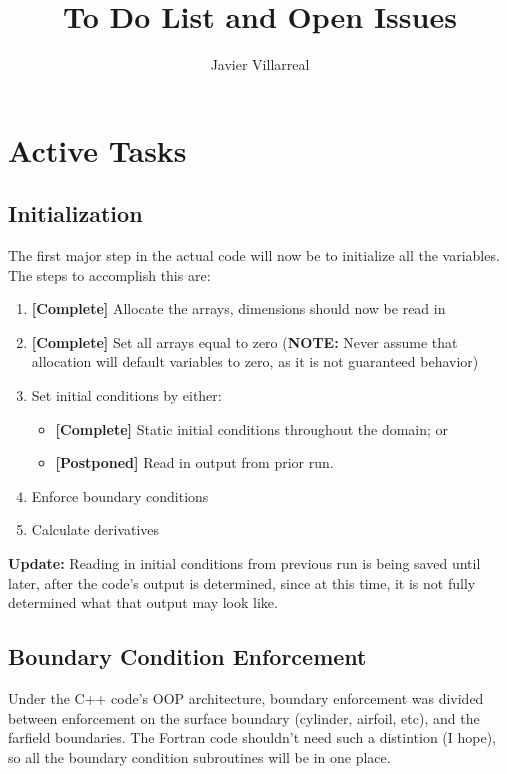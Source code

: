 \documentclass[12pt]{article}
\begin{document}
    \title{To Do List and Open Issues}
    \author{Javier Villarreal}
    \date{}
    \maketitle

    \section{Active Tasks}

    \subsection{Initialization}
    The first major step in the actual code will now be to initialize all the variables. The steps to accomplish this are:
    \begin{enumerate}
        \item \textbf{[Complete]} Allocate the arrays, dimensions should now be read in
        \item \textbf{[Complete]} Set all arrays equal to zero (\textbf{NOTE:} Never assume that allocation will default variables to zero, as it is not guaranteed behavior)
        \item Set initial conditions by either:
        \begin{itemize}
            \item \textbf{[Complete]} Static initial conditions throughout the domain; or
            \item \textbf{[Postponed]} Read in output from prior run.
        \end{itemize}
        \item Enforce boundary conditions
        \item Calculate derivatives
    \end{enumerate}
    
    \textbf{Update:} Reading in initial conditions from previous run is being saved until later, after the code's output is determined, since at this time, it is not fully determined what that output may look like.

    \subsection{Boundary Condition Enforcement}
    Under the C++ code's OOP architecture, boundary enforcement was divided between enforcement on the surface boundary (cylinder, airfoil, etc), and the farfield boundaries. The Fortran code shouldn't need such a distintion (I hope), so all the boundary condition subroutines will be in one place.
\end{document}
